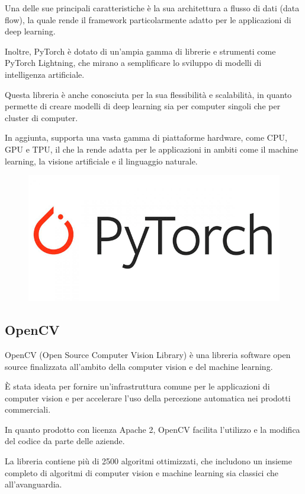 Una delle sue principali caratteristiche è la sua architettura a flusso di dati (data flow), la quale rende il framework particolarmente adatto per le applicazioni di deep learning. 

Inoltre, PyTorch è dotato di un'ampia gamma di librerie e strumenti come PyTorch Lightning, che mirano a semplificare lo sviluppo di modelli di intelligenza artificiale.

Questa libreria è anche conosciuta per la sua flessibilità e scalabilità, in quanto permette di creare modelli di deep learning sia per computer singoli che per cluster di computer. 

In aggiunta, supporta una vasta gamma di piattaforme hardware, come CPU, GPU e TPU, il che la rende adatta per le applicazioni in ambiti come il machine learning, la visione artificiale e il linguaggio naturale.

\begin{figure}
    \begin{center}    
        \includegraphics[width=0.9\linewidth]{images/image7.png}
    \end{center}
\end{figure}

\subsection{OpenCV \cite{OpenCv}}
OpenCV (Open Source Computer Vision Library) è una libreria software open source finalizzata all’ambito della computer vision e del machine learning. 

È stata ideata per fornire un'infrastruttura comune per le applicazioni di computer vision e per accelerare l'uso della percezione automatica nei prodotti commerciali. 

In quanto prodotto con licenza Apache 2, OpenCV facilita l'utilizzo e la modifica del codice da parte delle aziende.

La libreria contiene più di 2500 algoritmi ottimizzati, che includono un insieme completo di algoritmi di computer vision e machine learning sia classici che all'avanguardia. 

